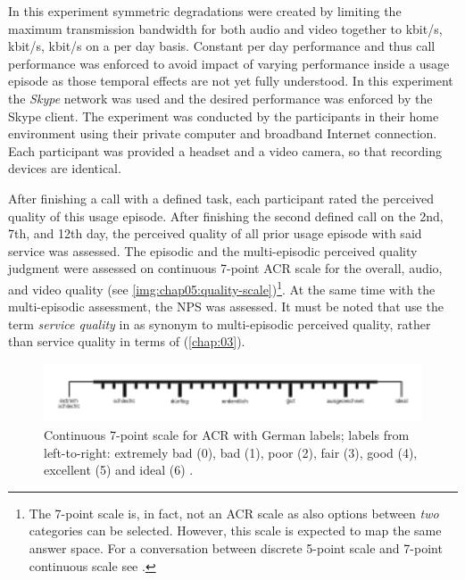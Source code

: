 In this experiment symmetric degradations were created by limiting the maximum transmission bandwidth for both audio and video together to \unit[500]{kbit/s}, \unit[150]{kbit/s}, \unit[32]{kbit/s} on a per day basis.
Constant per day performance and thus call performance was enforced to avoid impact of varying performance inside a usage episode as those temporal effects are not yet fully understood.
In this experiment the \emph{Skype} network was used and the desired performance was enforced by the Skype client.
The experiment was conducted by the participants in their home environment using their private computer and broadband Internet connection.
Each participant was provided a headset and a video camera, so that recording devices are identical.

After finishing a call with a defined task, each participant rated the perceived quality of this usage episode.
After finishing the second defined call on the 2nd, 7th, and 12th day, the perceived quality of all prior usage episode with said service was assessed.
The episodic and the multi-episodic perceived quality judgment were assessed on continuous 7-point \ac{ACR} scale \citep[\cf][p. 19]{itu-t_p.851:_2003} for the overall, audio, and video quality (see \autoref{img:chap05:quality-scale})\footnote{The 7-point scale is, in fact, not an \ac{ACR} scale as also options between \emph{two} categories can be selected. However, this scale is expected to map the same answer space. For a conversation between discrete 5-point scale and 7-point continuous scale see \cite{koster_comparison_2015}.}.
At the same time with the multi-episodic assessment, the \ac{NPS} was assessed.
It must be noted that \cite{moller_single-call_2011} use the term \emph{service quality} in as synonym to multi-episodic perceived quality, rather than service quality in terms of \cite{parasuraman_conceptual_1985} (\cf \autoref{chap:03}).

\begin{figure}[h]
	\includegraphics[width=1\textwidth]{fig/quality7pt_scale}
	\caption{Continuous 7-point scale for \ac{ACR} with German labels; labels from left-to-right: extremely bad (0), bad (1), poor (2), fair (3), good (4), excellent (5) and ideal (6) \citep{itu-t_p.805:_2007}.}
	\label{img:chap05:quality-scale}
\end{figure}

